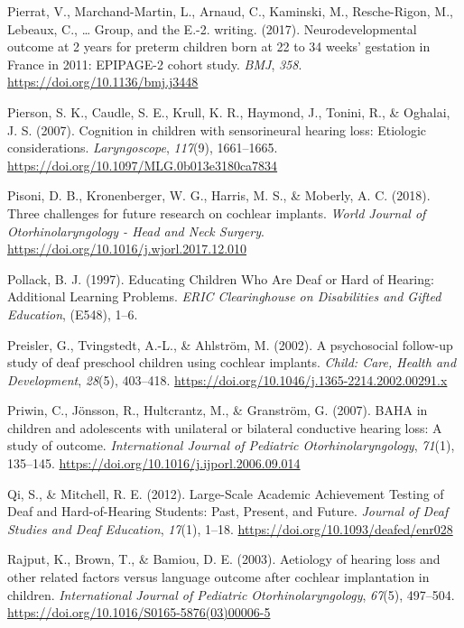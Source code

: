 \documentclass[english,man]{apa6}
\begin{document}
\leavevmode\hypertarget{ref-pierrat2017}{}%
Pierrat, V., Marchand-Martin, L., Arnaud, C., Kaminski, M., Resche-Rigon, M., Lebeaux, C., \ldots{} Group, and the E.-2. writing. (2017). Neurodevelopmental outcome at 2 years for preterm children born at 22 to 34 weeks' gestation in France in 2011: EPIPAGE-2 cohort study. \emph{BMJ}, \emph{358}. \url{https://doi.org/10.1136/bmj.j3448}

\leavevmode\hypertarget{ref-pierson2007}{}%
Pierson, S. K., Caudle, S. E., Krull, K. R., Haymond, J., Tonini, R., \& Oghalai, J. S. (2007). Cognition in children with sensorineural hearing loss: Etiologic considerations. \emph{Laryngoscope}, \emph{117}(9), 1661--1665. \url{https://doi.org/10.1097/MLG.0b013e3180ca7834}

\leavevmode\hypertarget{ref-pisoni2018}{}%
Pisoni, D. B., Kronenberger, W. G., Harris, M. S., \& Moberly, A. C. (2018). Three challenges for future research on cochlear implants. \emph{World Journal of Otorhinolaryngology - Head and Neck Surgery}. \url{https://doi.org/10.1016/j.wjorl.2017.12.010}

\leavevmode\hypertarget{ref-pollack1997}{}%
Pollack, B. J. (1997). Educating Children Who Are Deaf or Hard of Hearing: Additional Learning Problems. \emph{ERIC Clearinghouse on Disabilities and Gifted Education}, (E548), 1--6.

\leavevmode\hypertarget{ref-preisler2002}{}%
Preisler, G., Tvingstedt, A.-L., \& Ahlström, M. (2002). A psychosocial follow-up study of deaf preschool children using cochlear implants. \emph{Child: Care, Health and Development}, \emph{28}(5), 403--418. \url{https://doi.org/10.1046/j.1365-2214.2002.00291.x}

\leavevmode\hypertarget{ref-priwin2007}{}%
Priwin, C., Jönsson, R., Hultcrantz, M., \& Granström, G. (2007). BAHA in children and adolescents with unilateral or bilateral conductive hearing loss: A study of outcome. \emph{International Journal of Pediatric Otorhinolaryngology}, \emph{71}(1), 135--145. \url{https://doi.org/10.1016/j.ijporl.2006.09.014}

\leavevmode\hypertarget{ref-qi2012}{}%
Qi, S., \& Mitchell, R. E. (2012). Large-Scale Academic Achievement Testing of Deaf and Hard-of-Hearing Students: Past, Present, and Future. \emph{Journal of Deaf Studies and Deaf Education}, \emph{17}(1), 1--18. \url{https://doi.org/10.1093/deafed/enr028}

\leavevmode\hypertarget{ref-rajput2003}{}%
Rajput, K., Brown, T., \& Bamiou, D. E. (2003). Aetiology of hearing loss and other related factors versus language outcome after cochlear implantation in children. \emph{International Journal of Pediatric Otorhinolaryngology}, \emph{67}(5), 497--504. \url{https://doi.org/10.1016/S0165-5876(03)00006-5}
\end{document}

